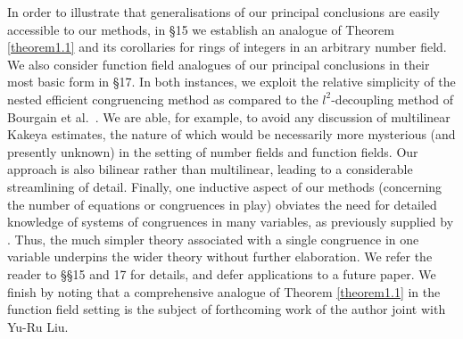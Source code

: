 \documentclass[12pt,reqno]{amsart}
\theoremstyle{definition}
\theoremstyle{remark}
\numberwithin{equation}{section}
\begin{document}
\par In order to illustrate that generalisations of our principal conclusions are easily 
accessible to our methods, in \S15 we establish an analogue of Theorem \ref{theorem1.1} 
and its corollaries for rings of integers in an arbitrary number field. We also consider function 
field analogues of our principal conclusions in their most basic form in \S17. In both 
instances, we exploit the relative simplicity of the nested efficient congruencing method as 
compared to the $l^2$-decoupling method of Bourgain et al.~\cite{BDG2016}. We are able, 
for example, to avoid any discussion of multilinear Kakeya estimates, the nature of which 
would be necessarily more mysterious (and presently unknown) in the setting of number 
fields and function fields. Our approach is also bilinear rather than multilinear, leading to a 
considerable streamlining of detail. Finally, one inductive aspect of our methods (concerning 
the number of equations or congruences in play) obviates the need for detailed knowledge 
of systems of congruences in many variables, as previously supplied by \cite{Woo1996}. 
Thus, the much simpler theory associated with a single congruence in one variable underpins 
the wider theory without further elaboration. We refer the reader to \S\S15 and 17 for 
details, and defer applications to a future paper. We finish by noting that a comprehensive 
analogue of Theorem \ref{theorem1.1} in the function field setting is the subject of 
forthcoming work of the author joint with Yu-Ru Liu.
\end{document}
